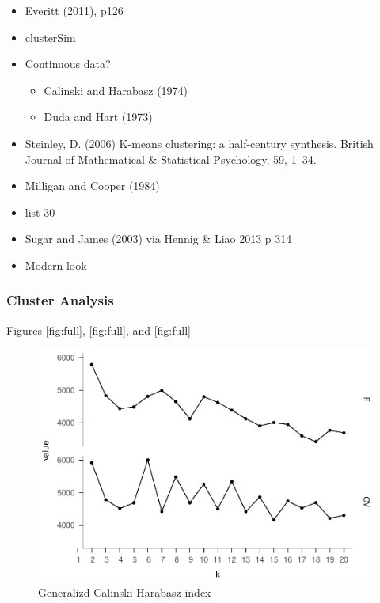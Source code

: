 \documentclass[floatsintext,man]{apa6}
\providecommand{\tightlist}{%
  \setlength{\itemsep}{0pt}\setlength{\parskip}{0pt}}
\theoremstyle{definition}
\theoremstyle{definition}
\theoremstyle{definition}
\theoremstyle{remark}
\begin{document}
\begin{itemize}
\item
  Everitt (2011), p126
\item
  clusterSim
\item
  Continuous data?

  \begin{itemize}
  \tightlist
  \item
    Calinski and Harabasz (1974)
  \item
    Duda and Hart (1973)
  \end{itemize}
\item
  Steinley, D. (2006) K-means clustering: a half-century synthesis.
  British Journal of Mathematical \& Statistical Psychology, 59, 1--34.
\item
  Milligan and Cooper (1984)
\item
  list 30
\item
  Sugar and James (2003) via Hennig \& Liao 2013 p 314
\item
  Modern look
\end{itemize}

\subsubsection{Cluster Analysis}\label{cluster-analysis-1}

Figures \ref{fig:full}, \ref{fig:full}, and \ref{fig:full}

\begin{figure}
\centering
\includegraphics{Method_files/figure-latex/ch-full-1.pdf}
\caption{\label{fig:ch-full}Generalizd Calinski-Harabasz index}
\end{figure}
\end{document}
